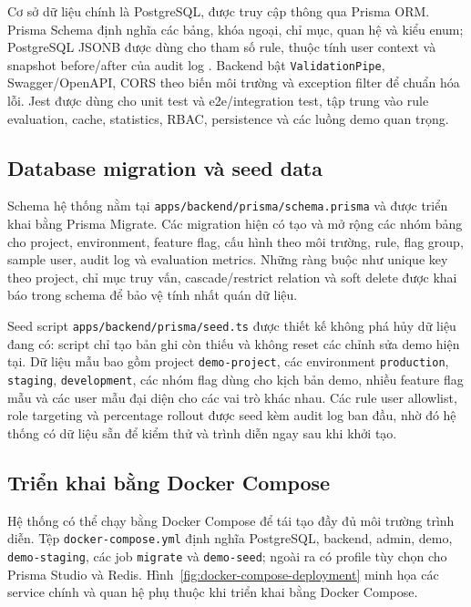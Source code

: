 Cơ sở dữ liệu chính là PostgreSQL, được truy cập thông qua Prisma ORM. Prisma Schema định nghĩa các bảng, khóa ngoại, chỉ mục, quan hệ và kiểu enum; PostgreSQL JSONB được dùng cho tham số rule, thuộc tính user context và snapshot before/after của audit log \cite{postgresql_json_types}. Backend bật \texttt{ValidationPipe}, Swagger/OpenAPI, CORS theo biến môi trường và exception filter để chuẩn hóa lỗi. Jest được dùng cho unit test và e2e/integration test, tập trung vào rule evaluation, cache, statistics, RBAC, persistence và các luồng demo quan trọng.

\subsection{Database migration và seed data}

Schema hệ thống nằm tại \texttt{apps/backend/prisma/schema.prisma} và được triển khai bằng Prisma Migrate. Các migration hiện có tạo và mở rộng các nhóm bảng cho project, environment, feature flag, cấu hình theo môi trường, rule, flag group, sample user, audit log và evaluation metrics. Những ràng buộc như unique key theo project, chỉ mục truy vấn, cascade/restrict relation và soft delete được khai báo trong schema để bảo vệ tính nhất quán dữ liệu.

Seed script \texttt{apps/backend/prisma/seed.ts} được thiết kế không phá hủy dữ liệu đang có: script chỉ tạo bản ghi còn thiếu và không reset các chỉnh sửa demo hiện tại. Dữ liệu mẫu bao gồm project \texttt{demo-project}, các environment \texttt{production}, \texttt{staging}, \texttt{development}, các nhóm flag dùng cho kịch bản demo, nhiều feature flag mẫu và các user mẫu đại diện cho các vai trò khác nhau. Các rule user allowlist, role targeting và percentage rollout được seed kèm audit log ban đầu, nhờ đó hệ thống có dữ liệu sẵn để kiểm thử và trình diễn ngay sau khi khởi tạo.

\subsection{Triển khai bằng Docker Compose}

Hệ thống có thể chạy bằng Docker Compose để tái tạo đầy đủ môi trường trình diễn. Tệp \texttt{docker-compose.yml} định nghĩa PostgreSQL, backend, admin, demo, \texttt{demo-staging}, các job \texttt{migrate} và \texttt{demo-seed}; ngoài ra có profile tùy chọn cho Prisma Studio và Redis. Hình~\ref{fig:docker-compose-deployment} minh họa các service chính và quan hệ phụ thuộc khi triển khai bằng Docker Compose.

